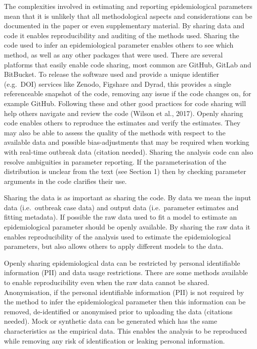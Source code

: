 \documentclass[
  10pt,
  letterpaper,
]{article}
\begin{document}
The complexities involved in estimating and reporting epidemiological
parameters mean that it is unlikely that all methodological aspects and
considerations can be documented in the paper or even supplementary
material. By sharing data and code it enables reproducibility and
auditing of the methods used. Sharing the code used to infer an
epidemiological parameter enables others to see which method, as well as
any other packages that were used. There are several platforms that
easily enable code sharing, most common are GitHub, GitLab and
BitBucket. To release the software used and provide a unique identifier
(e.g.~DOI) services like Zenodo, Figshare and Dyrad, this provides a
single referenceable snapshot of the code, removing any issue if the
code changes on, for example GitHub. Following these and other good
practices for code sharing will help others navigate and review the code
(Wilson et al., 2017). Openly sharing code enables others to reproduce
the estimates and verify the estimates. They may also be able to assess
the quality of the methods with respect to the available data and
possible bias-adjustments that may be required when working with
real-time outbreak data (citation needed). Sharing the analysis code can
also resolve ambiguities in parameter reporting. If the parameterisation
of the distribution is unclear from the text (see Section 1) then by
checking parameter arguments in the code clarifies their use.

Sharing the data is as important as sharing the code. By data we mean
the input data (i.e.~outbreak case data) and output data (i.e.~parameter
estimates and fitting metadata). If possible the raw data used to fit a
model to estimate an epidemiological parameter should be openly
available. By sharing the raw data it enables reproducibility of the
analysis used to estimate the epidemiological parameters, but also
allows others to apply different models to the data.

Openly sharing epidemiological data can be restricted by personal
identifiable information (PII) and data usage restrictions. There are
some methods available to enable reproducibility even when the raw data
cannot be shared. Anonymisation, if the personal identifiable
information (PII) is not required by the method to infer the
epidemiological parameter then this information can be removed,
de-identified or anonymised prior to uploading the data (citations
needed). Mock or synthetic data can be generated which has the same
characteristics as the empirical data. This enables the analysis to be
reproduced while removing any risk of identification or leaking personal
information.
\end{document}

